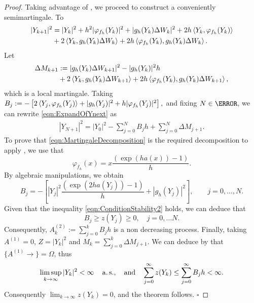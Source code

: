 \begin{proof}
	Taking advantage of , we proceed to construct a conveniently 
	semimartingale. To
	\begin{align}
		|Y_{k+1}|^2
			&=
				|Y_{k}|^2
				+h^2|\varphi_{f_h}(Y_{k})|^2 
				+|g_h(Y_k) \Delta W_k|^2 \notag 
				+2h\left\langle Y_k, \varphi_{f_h}(Y_{k})\right\rangle 
				\notag\\
			&
				+2\left\langle Y_k, g_h(Y_{k})\Delta W_k\right\rangle
				+2h\left\langle\varphi_{f_h}(Y_{k}), g_h(Y_{k})\Delta W_k\right\rangle.
			\label{eqn:ExpandOfYnext}
	\end{align}
	Let 
	\begin{align*}
		\Delta M_{k+1}
			&:=
				|g_h(Y_k)\Delta W_{k+1}|^2 - |g_h(Y_k)|^2 h \notag \\
			&
			+2\left\langle Y_k, g_h(Y_{k})\Delta W_{k+1}\right\rangle
			+2h\left\langle\varphi_{f_h}(Y_{k}), g_h(Y_{k})\Delta W_{k+1}\right\rangle, \notag
	\end{align*}
	which is a local martingale.
	Taking
	$ %
		B_j:=
			-\left[
					2\innerprod{Y_j}{\varphi_{f_h}(Y_j)}
					+|g_h(Y_j)|^2
				+h|\varphi_{f_h}(Y_j)|^2
			\right],
	$ %
	and fixing $N\in \N$, we can rewrite \eqref{eqn:ExpandOfYnext} as
	\begin{align}\label{eqn:MartingaleDecomposition}
		|Y_{N+1}|^2 = 
			|Y_0|^2
				-\sum_{j=0}^{N} B_j h
				+\sum_{j=0}^{N} \Delta M_{j+1}.
	\end{align} 
	To prove that \eqref{eqn:MartingaleDecomposition} is the required decomposition to apply
	, we use that
	\begin{equation}\label{eqn:varphih(x)}
		\varphi_{f_h}(x)
			= x\frac{\left(\exp(h a(x))-1\right)}{h}.
	\end{equation}
	By algebraic manipulations, we obtain
	\begin{equation*}
		B_j=
		-\left[
			|Y_j|^2\frac{(\exp(2h a(Y_j))-1)}{h}
			+|g_h(Y_j)|^2
		\right],
		\qquad
		 j=0,\dots,N.
	\end{equation*}
	Given that the inequality \eqref{eqn:ConditionStability2} holds, we can deduce that
	$$
		B_j\geq z(Y_j) \geq 0, \quad j=0,\ldots N.
	$$
	Consequently, $A_k^{(2)}:=\sum_{j=0}^k B_jh$ is a non decreasing process.
	Finally, taking $A^{(1)}=0$,  $Z=|Y_k|^2$ and $M_k=\sum_{j=0}^k \Delta M_{j+1}$.
	We can deduce  by  that $\{A^{(1)}\to\}=\Omega$, thus
	\begin{align*}
	 \limsup_{k\to \infty}
			|Y_k|^2 < \infty \quad \operatorname*{a.s.},
		\quad \text{and} \quad
		\sum_{j=0}^\infty z(Y_k) 
		\leq 
		\sum_{j=0}^\infty B_jh < \infty.
	\end{align*}
	Consequently
	$
		\lim_{k\to \infty} z(Y_k) =0
	$,
	and the theorem follows.
	$\square$
\end{proof}
%
